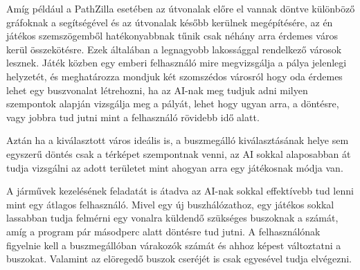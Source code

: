 Amíg például a PathZilla esetében az útvonalak előre el vannak döntve különböző gráfoknak a segítségével és az útvonalak később kerülnek megépítésére, az én játékos szemszögemből hatékonyabbnak tűnik csak néhány arra érdemes város kerül összekötésre. Ezek általában a legnagyobb lakossággal rendelkező városok lesznek. Játék közben egy emberi felhasználó mire megvizsgálja a pálya jelenlegi helyzetét, és meghatározza mondjuk két szomszédos városról hogy oda érdemes lehet egy buszvonalat létrehozni, ha az AI-nak meg tudjuk adni milyen szempontok alapján vizsgálja meg a pályát, lehet hogy ugyan arra, a döntésre, vagy jobbra tud jutni mint a felhasználó rövidebb idő alatt.

Aztán ha a kiválasztott város ideális is, a buszmegálló kiválasztásának helye sem egyszerű döntés csak a térképet szempontnak venni, az AI sokkal alaposabban át tudja vizsgálni az adott területet mint ahogyan arra egy játékosnak módja van.

A járművek kezelésének feladatát is átadva az AI-nak sokkal effektívebb tud lenni mint egy átlagos felhasználó. Mivel egy új buszhálózathoz, egy játékos sokkal lassabban tudja felmérni egy vonalra küldendő szükséges buszoknak a számát, amíg a program pár másodperc alatt döntésre tud jutni. A felhasználónak figyelnie kell a buszmegállóban várakozók számát és ahhoz képest változtatni a buszokat. Valamint az elöregedő buszok cseréjét is csak egyesével tudja elvégezni.